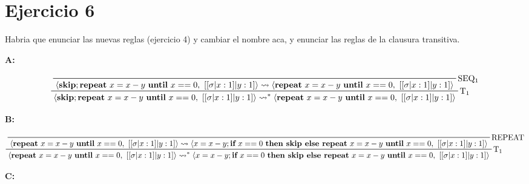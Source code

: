 \documentclass[11pt]{article}
\newcommand{\curly}{\mathrel{\leadsto}}
\begin{document}
\section*{Ejercicio 6}

Habria que enunciar las nuevas reglas (ejercicio 4) y cambiar el nombre aca, y enunciar las reglas de la clausura transitiva.

\begin{landscape}


\textbf{A:}

\begin{displaymath}
    \prftree[r]{$\mathrm{T_1}$}{
        \prftree[r]{$\mathrm{SEQ_1}$}
        {\langle \textbf{skip}; \textbf{repeat}\ x=x-y\ \textbf{until}\ x==0,\ [[\sigma|x:1]|y:1] \rangle \curly \langle \textbf{repeat}\ x=x-y\ \textbf{until}\ x==0,\ [[\sigma|x:1]|y:1] \rangle}
    }
    {\langle \textbf{skip}; \textbf{repeat}\ x=x-y\ \textbf{until}\ x==0,\ [[\sigma|x:1]|y:1] \rangle \curly^* \langle \textbf{repeat}\ x=x-y\ \textbf{until}\ x==0,\ [[\sigma|x:1]|y:1] \rangle}
\end{displaymath}

\textbf{B:}

\begin{displaymath}
    \prftree[r]{$\mathrm{T_1}$}{
        \prftree[r]{$\mathrm{REPEAT}$}
        {\langle \textbf{repeat}\ x=x-y\ \textbf{until}\ x==0,\ [[\sigma|x:1]|y:1] \rangle \curly \langle x=x-y; \textbf{if}\ x==0\ \textbf{then\ skip\ else\ repeat}\ x=x-y\ \textbf{until}\ x==0,\ [[\sigma|x:1]|y:1] \rangle}
    }
    {\langle \textbf{repeat}\ x=x-y\ \textbf{until}\ x==0,\ [[\sigma|x:1]|y:1] \rangle \curly^* \langle x=x-y; \textbf{if}\ x==0\ \textbf{then\ skip\ else\ repeat}\ x=x-y\ \textbf{until}\ x==0,\ [[\sigma|x:1]|y:1] \rangle}
\end{displaymath}

\textbf{C:}


\end{landscape}
\end{document}
